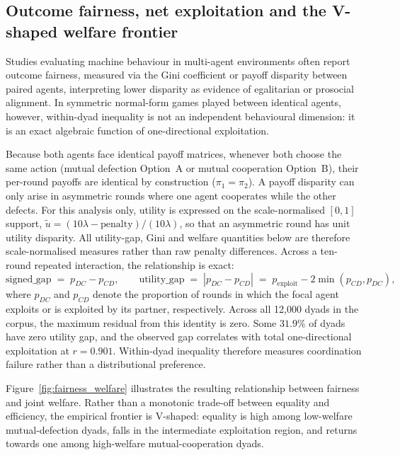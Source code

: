 \documentclass[openacc]{rsproca_new}
\begin{document}
\subsection{Outcome fairness, net exploitation and the V-shaped welfare frontier}\label{appendix:fairness_welfare}

Studies evaluating machine behaviour in multi-agent environments often report
outcome fairness, measured via the Gini coefficient or payoff disparity between
paired agents, interpreting lower disparity as evidence of egalitarian or
prosocial alignment. In symmetric normal-form games played between identical
agents, however, within-dyad inequality is not an independent behavioural
dimension: it is an exact algebraic function of one-directional exploitation.

Because both agents face identical payoff matrices, whenever both choose the
same action (mutual defection Option~A or mutual cooperation Option~B), their
per-round payoffs are identical by construction ($\pi_1 = \pi_2$). A payoff
disparity can only arise in asymmetric rounds where one agent cooperates while
the other defects. For this analysis only, utility is expressed on the
scale-normalised $[0,1]$ support,
$\tilde u=(10\lambda-\mathrm{penalty})/(10\lambda)$, so that an asymmetric
round has unit utility disparity. All utility-gap, Gini and welfare quantities
below are therefore scale-normalised measures rather than raw penalty
differences. Across a ten-round repeated interaction, the relationship is exact:
\begin{equation}
\text{signed\_gap} \;=\; p_{DC} - p_{CD}, \qquad
\text{utility\_gap} \;=\; |p_{DC} - p_{CD}| \;=\; p_{\text{exploit}} - 2 \min(p_{CD}, p_{DC}),
\label{eq:fairness_identity}
\end{equation}
where $p_{DC}$ and $p_{CD}$ denote the proportion of rounds in which the focal
agent exploits or is exploited by its partner, respectively. Across all
12{,}000 dyads in the corpus, the maximum residual from this identity is zero.
Some $31.9\%$ of dyads have zero utility gap, and the observed gap correlates
with total one-directional exploitation at $r = 0.901$. Within-dyad inequality
therefore measures coordination failure rather than a distributional preference.

Figure~\ref{fig:fairness_welfare} illustrates the resulting relationship between
fairness and joint welfare. Rather than a monotonic trade-off between equality
and efficiency, the empirical frontier is V-shaped: equality is high among
low-welfare mutual-defection dyads, falls in the intermediate exploitation
region, and returns towards one among high-welfare mutual-cooperation dyads.
\end{document}
